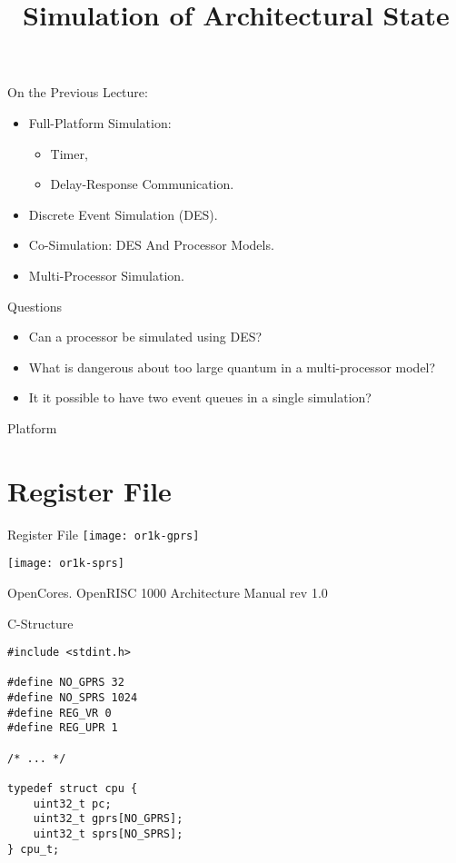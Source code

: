 

\title{Simulation of Architectural State}



\startslides

\begin{frame}{On the Previous Lecture:}
\begin{itemize}
\item Full-Platform Simulation:
  \begin{itemize}
  \item Timer,
  \item Delay-Response Communication.
  \end{itemize}
\item Discrete Event Simulation (DES).
\item Co-Simulation: DES And Processor Models.
\item Multi-Processor Simulation.
\end{itemize}
\end{frame}

\begin{frame}{Questions}
\begin{itemize}
\item Can a processor be simulated using DES?\pause
\item What is dangerous about too large quantum in a multi-processor model?\pause
\item It it possible to have two event queues in a single simulation?
\end{itemize}
\end{frame}

\begin{frame}{Platform}
\centering
\vfill
{}
\vfill
\end{frame}

\section{Register File}

\begin{frame}{Register File}
\centering
\texttt{[image: or1k-gprs]}

\texttt{[image: or1k-sprs]}

\tiny{OpenCores. OpenRISC 1000 Architecture Manual rev 1.0}
\end{frame}

\begin{frame}[fragile]{C-Structure}
\begin{lstlisting}
#include <stdint.h>

#define NO_GPRS 32
#define NO_SPRS 1024
#define REG_VR 0
#define REG_UPR 1

/* ... */

typedef struct cpu {
    uint32_t pc;
    uint32_t gprs[NO_GPRS];
    uint32_t sprs[NO_SPRS];
} cpu_t;
\end{lstlisting}
\end{frame}

